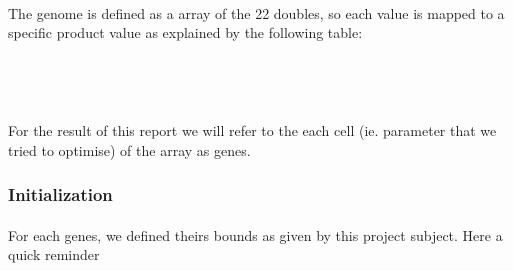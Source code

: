 \documentclass{article}
\begin{document}
      \paragraph{} %
      \label{par:}
        The genome is defined as a array of the 22 doubles, so each value is mapped to a
        specific product value as explained by the following table:
      \\
      \\
      \\
      \\

      
      \paragraph{} %
      \label{par:}
        For the result of this report we will refer to the each cell (ie. parameter that
        we tried to optimise) of the array as genes.
    
    \subsubsection{Initialization} %
    \label{ssub:initialization}
      
      \paragraph{} %
      \label{par:}
        For each genes, we defined theirs bounds as given by this project subject.
        Here a quick reminder
      
\end{document}
